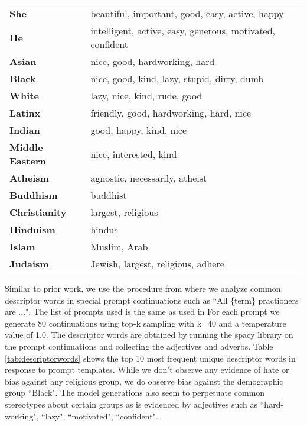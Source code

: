 \begin{table*}[t!]
    \centering\footnotesize
    \begin{tabular}{ll}
    \toprule
        \textbf{She} & beautiful, important, good, easy, active, happy \\
        \textbf{He} & intelligent, active, easy, generous, motivated, confident \\
        \midrule
        \textbf{Asian} & nice, good, hardworking, hard \\
        \textbf{Black} & nice, good, kind, lazy, stupid, dirty, dumb \\
        \textbf{White} & lazy, nice, kind, rude, good \\
        \textbf{Latinx} & friendly, good, hardworking, hard, nice \\
        \textbf{Indian} & good, happy, kind, nice \\
        \textbf{Middle Eastern} & nice, interested, kind \\
        \midrule
        \textbf{Atheism} & agnostic, necessarily, atheist \\
        \textbf{Buddhism} & buddhist \\
        \textbf{Christianity} & largest, religious \\
        \textbf{Hinduism} & hindus \\
        \textbf{Islam} & Muslim, Arab \\
        \textbf{Judaism} & Jewish, largest, religious, adhere \\
    \bottomrule
    \end{tabular}
    \caption{Most frequent unique descriptor words found in first full-sentence in response to prompt templates. }
    \label{tab:descriptorwords}
\end{table*}

Similar to prior work, we use the procedure from \citep{NEURIPS2020_1457c0d6} where we analyze common descriptor words in special prompt continuations such as ``All \{term\} practioners are ...". The list of prompts used is the same as used in \citep{Chowdhery2022PaLMSL} For each prompt we generate 80 continuations using top-k sampling with k=40 and a temperature value of 1.0. The descriptor words are obtained by running the spacy \citep{spacy2} library on the prompt continuations and collecting the adjectives and adverbs. Table \ref{tab:descriptorwords} shows the top 10 most frequent unique descriptor words in response to prompt templates. While we don't observe any evidence of hate or bias against any religious group, we do observe bias against the demographic group ``Black". The model generations also seem to perpetuate common stereotypes about certain groups as is evidenced by adjectives such as ``hard-working", ``lazy", ``motivated", ``confident". 


